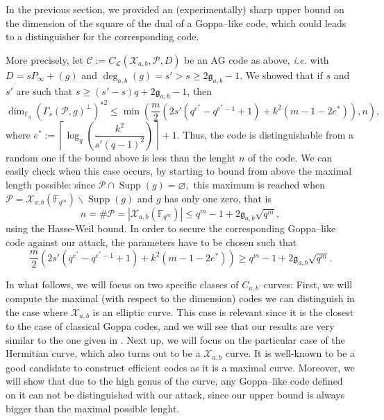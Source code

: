 \documentclass[a4paper]{article}
\theoremstyle{definition}
\theoremstyle{remark}
\newcommand{\calP}{\mathcal{P}}
\newcommand{\calL}{\mathcal{L}}
\newcommand{\calC}{\mathcal{C}}
\newcommand{\calX}{\mathcal{X}}
\newcommand{\fqm}{\mathbb{F}_{q^m}}
\newcommand{\fq}{\mathbb{F}_{q}}
\newcommand{\Supp}{\operatorname{Supp}}
\newcommand{\degab}[1]{\deg_{a,b}\left(#1\right)}
\begin{document}
\noindent In the previous section, we provided an (experimentally) sharp upper bound on the dimension of the square of the dual of a Goppa--like code, which could leads to a distinguisher for the corresponding code. 

More precisely, let $\calC := C_\calL(\calX_{a,b},\calP,D)$ be an AG code as above, \emph{i.e.} with $D = sP_\infty +(g)$ and $\degab{g} = s'>s\geq 2\mathfrak{g}_{a,b}-1$. We showed that if $s$ and $s'$ are such that $s \geq (s'-s)q+2\mathfrak{g}_{a,b}-1$, then
\begin{equation} \label{eq:best_upper_bound}
\dim_{\fq} (\Gamma_s(\calP,g)^{\perp})^{\star 2} \leq \min \left(\frac{m}{2}\left(2s'(q^{e^*}-q^{e^*-1}+1)+k^2(m-1-2e^*)  \right),n\right),
\end{equation}
where $e^* := \left\lceil \log_q\left(\dfrac{k^2}{s'(q-1)^2}\right)\right\rceil+1$. Thus, the code is distinguishable from a random one if the bound above is less than the lenght $n$ of the code. We can easily check when this case occurs, by starting to bound from above the maximal length possible: since $\calP \cap \Supp(g) = \varnothing,$ this maximum is reached when $\calP = \calX_{a,b}(\fqm) \backslash \Supp(g)$ and $g$ has only one zero, that is
$$n = \# \calP = |\calX_{a,b}(\fqm)| \leq q^m-1+2\mathfrak{g}_{a,b}\sqrt{q^m},$$
using the Hasse-Weil bound. In order to secure the corresponding Goppa--like code against our attack, the parameters have to be chosen such that 
\begin{equation} \label{eq:cond_not_to_distinguish}
\frac{m}{2}\left(2s'(q^{e^*}-q^{e^*-1}+1)+k^2(m-1-2e^*)  \right)\geq q^m-1+2\mathfrak{g}_{a,b}\sqrt{q^m}.
\end{equation}

\noindent In what follows, we will focus on two specific classes of $C_{a,b}$--curves: First, we will compute the maximal (with respect to the dimension) codes we can distinguish in the case where $\calX_{a,b}$ is an elliptic curve. This case is relevant since it is the closest to the case of classical Goppa codes, and we will see that our results are very similar to the one given in \cite{MT21}. Next up, we will focus on the particular case of the Hermitian curve, which also turns out to be a $\calX_{a,b}$ curve. It is well-known to be a good candidate to construct efficient codes as it is a maximal curve. Moreover, we will show that due to the high genus of the curve, any Goppa--like code defined on it can not be distinguished with our attack, since our upper bound is always bigger than the maximal possible lenght.
\end{document}
